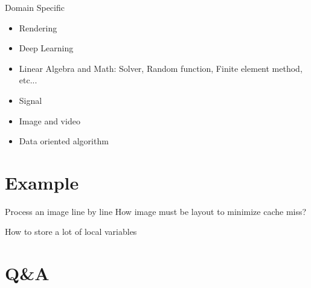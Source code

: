 \documentclass{beamer}
\begin{document}
\begin{frame}{Domain Specific}
	\begin{itemize}
		\item Rendering
		\item Deep Learning
		\item Linear Algebra and Math: Solver, Random function, Finite element method, etc...
		\item Signal
		\item Image and video
		\item Data oriented algorithm
	\end{itemize}
\end{frame}

\section{Example}


\begin{frame}{Process an image line by line}
\codeExampleOne
How image must be layout to minimize cache miss?
\end{frame}



\begin{frame}{How to store a lot of local variables}
\codeExampleTwo

\end{frame}



\section{Q\&A}
\end{document}
